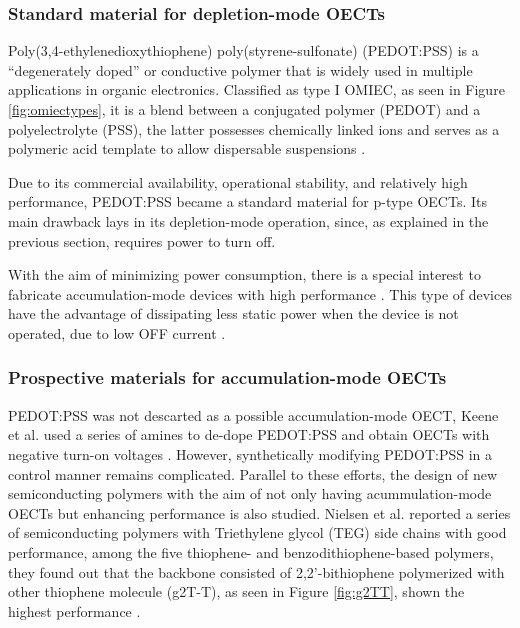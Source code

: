 \subsubsection{Standard material for depletion-mode OECTs}

Poly(3,4-ethylenedioxythiophene) poly(styrene-sulfonate) (PEDOT:PSS) is a ``degenerately doped'' \cite{bernardsSteadyStateTransientBehavior2007} or conductive polymer that is widely used in multiple applications in organic electronics. Classified as type I OMIEC, as seen in Figure \ref{fig:omiectypes}, it is a blend between a conjugated polymer (PEDOT) and a polyelectrolyte (PSS), the latter possesses chemically linked ions and serves as a polymeric acid template to allow dispersable suspensions \cite{paulsenOrganicMixedIonic2020}.

Due to its commercial availability, operational stability, and relatively high performance, PEDOT:PSS became a standard material for p-type OECTs. Its main drawback lays in its depletion-mode operation, since, as explained in the previous section, requires power to turn off. 

With the aim of minimizing power consumption, there is a special interest to fabricate accumulation-mode devices with high performance \cite{nielsenMolecularDesignSemiconducting2016}\cite{tanOrganicMixedIonic2022}\cite{inalBenchmarkingOrganicMixed2017}\cite{keeneEnhancementModePEDOTPSS2020}. This type of devices have the advantage of dissipating less static power when the device is not operated, due to low OFF current %
\cite{giovannittiEnergeticControlRedoxActive2020}.

\subsubsection{Prospective materials for accumulation-mode OECTs}
PEDOT:PSS was not descarted as a possible accumulation-mode OECT, Keene et al. used a series of amines to de-dope PEDOT:PSS and obtain OECTs with negative turn-on voltages \cite{keeneEnhancementModePEDOTPSS2020}. However, synthetically modifying PEDOT:PSS in a control manner remains complicated. Parallel to these efforts, the design of new semiconducting polymers with the aim of not only having acummulation-mode OECTs but enhancing performance is also studied. Nielsen et al. reported a series of semiconducting polymers with Triethylene glycol (TEG) side chains with good performance, among the five thiophene- and benzodithiophene-based polymers, they found out that the %
backbone consisted of 2,2'-bithiophene polymerized with other thiophene molecule (g2T-T), as seen in Figure \ref{fig:g2TT}, shown the highest performance %
\cite{nielsenMolecularDesignSemiconducting2016}.

